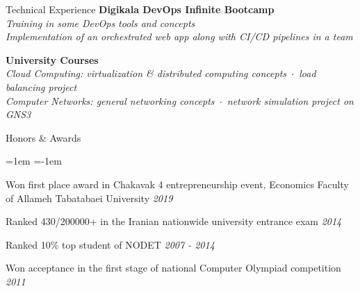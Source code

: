 \documentclass{resume} %
\begin{document}
\begin{rSection}{Technical Experience}
  {\bf Digikala DevOps Infinite Bootcamp} \\
  {\em Training in some DevOps tools and concepts} \\
  {\em Implementation of an orchestrated web app along with CI/CD pipelines in a team}

  {\bf University Courses} \\
  {\em Cloud Computing: virtualization \& distributed computing concepts~$\cdot$~load balancing project} \\
  {\em Computer Networks: general networking concepts~$\cdot$~network simulation project on GNS3}


\end{rSection}

\begin{rSection}{Honors \& Awards}
  \begin{list}{}%
    {\leftmargin=1em \itemindent=-1em}
    \item Won first place award in Chakavak 4 entrepreneurship event, Economics Faculty of Allameh Tabatabaei University \hfill {\em 2019}
    \item Ranked 430/200000+ in the Iranian nationwide university entrance exam \hfill {\em 2014}
    \item Ranked 10\% top student of NODET  \hfill {\em 2007 - 2014}
    \item Won acceptance in the first stage of national Computer Olympiad competition  \hfill {\em 2011}
  \end{list}
\end{rSection}
\end{document}
